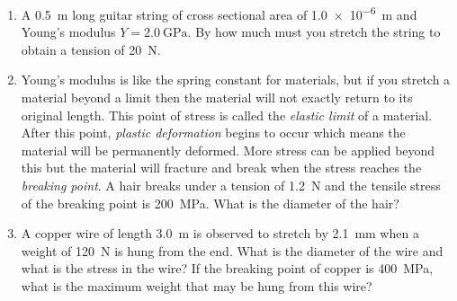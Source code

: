 \begin{enumerate}
\item
A \SI{0.5}{\meter} long guitar string of cross sectional area of \SI{1.0e-6}{\meter} and Young's modulus $Y=\SI{2.0}{\giga\pascal}$. By how much must you stretch the string to obtain a tension of \SI{20}{\newton}.

\item
Young's modulus is like the spring constant for materials, but if you stretch a material beyond a limit then the material will not exactly return to its original length. This point of stress is called the \emph{elastic limit} of a material. After this point, \emph{plastic deformation} begins to occur which means the material will be permanently deformed. More stress can be applied beyond this but the material will fracture and break when the stress reaches the \emph{breaking point}. A hair breaks under a tension of \SI{1.2}{\newton} and the tensile stress of the breaking point is \SI{200}{\mega\pascal}. What is the diameter of the hair?

\item
A copper wire of length \SI{3.0}{\meter} is observed to stretch by \SI{2.1}{\milli\meter} when a weight of \SI{120}{\newton} is hung from the end. What is the diameter of the wire and what is the stress in the wire? If the breaking point of copper is \SI{400}{\mega\pascal}, what is the maximum weight that may be hung from this wire?





\newpage 


\end{enumerate}

